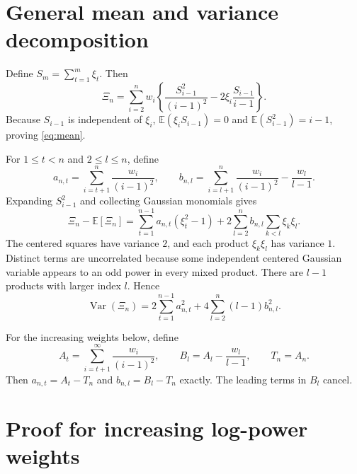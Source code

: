 \documentclass[11pt]{article}
\begin{document}
\section{General mean and variance decomposition}

Define $S_m=\sum_{t=1}^m\xi_t$.  Then
\begin{equation}
\Xi_n=\sum_{i=2}^n w_i\left\{
\frac{S_{i-1}^2}{(i-1)^2}-2\xi_i\frac{S_{i-1}}{i-1}\right\}.
\label{eq:expanded}
\end{equation}
Because $S_{i-1}$ is independent of $\xi_i$,
$\mathbb E(\xi_iS_{i-1})=0$ and $\mathbb E(S_{i-1}^2)=i-1$, proving
\eqref{eq:mean}.

For $1\leq t<n$ and $2\leq l\leq n$, define
\[
a_{n,t}=\sum_{i=t+1}^n\frac{w_i}{(i-1)^2},\qquad
b_{n,l}=\sum_{i=l+1}^n\frac{w_i}{(i-1)^2}-\frac{w_l}{l-1}.
\]
Expanding $S_{i-1}^2$ and collecting Gaussian monomials gives
\begin{equation}
\Xi_n-\mathbb E[\Xi_n]
=\sum_{t=1}^{n-1}a_{n,t}(\xi_t^2-1)
+2\sum_{l=2}^n b_{n,l}\sum_{k<l}\xi_k\xi_l.
\label{eq:decomp}
\end{equation}
The centered squares have variance $2$, and each product $\xi_k\xi_l$ has
variance $1$.  Distinct terms are uncorrelated because some independent
centered Gaussian variable appears to an odd power in every mixed product.
There are $l-1$ products with larger index $l$.  Hence
\begin{equation}
\operatorname{Var}(\Xi_n)=2\sum_{t=1}^{n-1}a_{n,t}^2
+4\sum_{l=2}^n(l-1)b_{n,l}^2.
\label{eq:variance}
\end{equation}

For the increasing weights below, define
\[
A_t=\sum_{i=t+1}^\infty\frac{w_i}{(i-1)^2},\qquad
B_l=A_l-\frac{w_l}{l-1},\qquad T_n=A_n.
\]
Then $a_{n,t}=A_t-T_n$ and $b_{n,l}=B_l-T_n$ exactly.  The leading terms
in $B_l$ cancel.

\section{Proof for increasing log-power weights}
\end{document}

